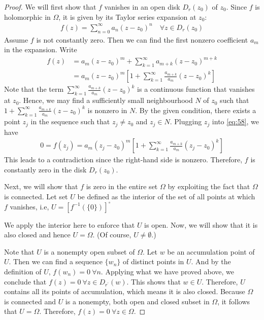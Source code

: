 \documentclass[thmcnt=section, color=cyan, 12pt]{my-elegantbook}
\begin{document}
\begin{proof}
    We will first show that $f$ vanishes in an open disk $D_r(z_0)$ of $z_0$.
    Since $f$ is holomorphic in $\Omega$, it is given by its Taylor series expansion at $z_0$:
    \begin{align*}
        f(z) = \sum_{n=0}^\infty a_n  (z - z_0)^n \quad \forall z \in D_r(z_0)
    \end{align*}
    Assume $f$ is not constantly zero.
    Then we can find the first nonzero coefficient $a_m$ in the expansion.
    Write
    \begin{align}
        f(z) & = a_m(z - z_0)^m + \sum_{k=1}^\infty a_{m+k}  (z - z_0)^{m+k} \nonumber \\
             & = a_m(z - z_0)^m \left[
            1 + \sum_{k=1}^\infty \frac{a_{m+k}}{a_m}  (z - z_0)^{k}
            \right]
        \label{eq:58}
    \end{align}
    Note that the term $\sum_{k=1}^\infty \frac{a_{m+k}}{a_m}  (z - z_0)^{k}$ is a continuous function that vanishes at $z_0$.
    Hence, we may find a sufficiently small neighbourhood $N$ of $z_0$ such that $1 + \sum_{k=1}^\infty \frac{a_{m+k}}{a_m}  (z - z_0)^{k}$ is nonzero in $N$.
    By the given condition, there exists a point $z_j$ in the sequence such that $z_j \neq z_0$ and $z_j \in N$.
    Plugging $z_j$ into \eqref{eq:58}, we have
    \begin{align*}
        0 = f(z_j) = a_m(z_j - z_0)^m \left[
            1 + \sum_{k=1}^\infty \frac{a_{m+k}}{a_m}  (z_j - z_0)^{k}
            \right]
    \end{align*}
    This leads to a contradiction since the right-hand side is nonzero.
    Therefore, $f$ is constantly zero in the disk $D_r(z_0)$.

    Next, we will show that $f$ is zero in the entire set $\Omega$ by exploiting the fact that $\Omega$ is connected.
    Let set $U$ be defined as the interior of the set of all points at which $f$ vanishes, i.e, $U = [f^{-1}(\{0\})]^\circ$
    \begin{note}
        We apply the interior here to enforce that $U$ is open. Now, we will show that it is also closed and hence $U = \Omega$. (Of course, $U \neq \emptyset$.)
    \end{note}

    Note that $U$ is a nonempty open subset of $\Omega$.
    Let $w$ be an accumulation point of $U$.
    Then we can find a sequence $\{w_n\}$ of distinct points in $U$.
    And by the definition of $U$, $f(w_n) = 0 \ \forall n$.
    Applying what we have proved above, we conclude that $f(z) = 0 \ \forall z \in D_{r^\prime} (w)$.
    This shows that $w \in U$.
    Therefore, $U$ contains all its points of accumulation, which means it is also closed.
    Because $\Omega$ is connected and $U$ is a nonempty, both open and closed subset in $\Omega$, it follows that $U = \Omega$.
    Therefore, $f(z) = 0 \ \forall z \in \Omega$.
\end{proof}



\printbibliography[heading=bibintoc, title=References]


\printindex
\end{document}

